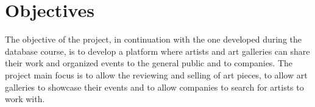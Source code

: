 \section{Objectives}


The objective of the project, in continuation with the one developed during the database course,
is to develop a platform where artists and art galleries can share their work and organized events
to the general public and to companies. The project main focus is to allow the reviewing and selling
of art pieces, to allow art galleries to showcase their events and to allow companies to search for 
artists to work with.